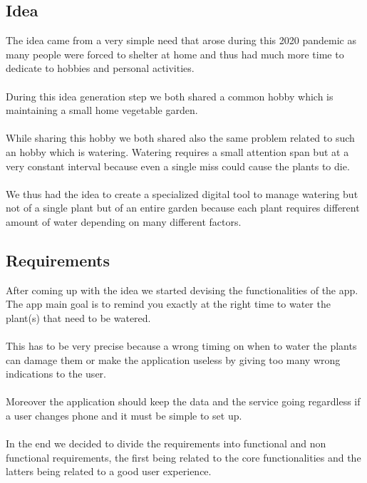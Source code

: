 \documentclass[10pt]{article}
\begin{document}
	\subsection{Idea}
	The idea came from a very simple need that arose during this 2020 pandemic as many people were forced to shelter at home and thus had much more time to dedicate to hobbies and personal activities. \\\\
	During this idea generation step we both shared a common hobby which is maintaining a small home vegetable garden. \\\\
	While sharing this hobby we both shared also the same problem related to such an hobby which is watering. Watering requires a small attention span but at a very constant interval because even a single miss could cause the plants to die. \\\\
	We thus had the idea to create a specialized digital tool to manage watering but not of a single plant but of an entire garden because each plant requires different amount of water depending on many different factors.
	
	\newpage
	\subsection{Requirements}
	After coming up with the idea we started devising the functionalities of the app. The app main goal is to remind you exactly at the right time to water the plant(s) that need to be watered. \\\\
	This has to be very precise because a wrong timing on when to water the plants can damage them or make the application useless by giving too many wrong indications to the user. \\\\
	Moreover the application should keep the data and the service going regardless if a user changes phone and it must be simple to set up.\\\\
	In the end we decided to divide the requirements into functional and non functional requirements, the first being related to the core functionalities and the latters being related to a good user experience.
	
\end{document}
